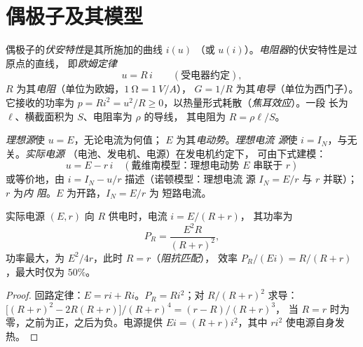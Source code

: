 \section{偶极子及其模型}

\begin{definition}\label{def:b1:dc-circuits:resistor}
偶极子的\emph{伏安特性}是其所施加的曲线 $i(u)$
（或 $u(i)$）。\emph{电阻器}的伏安特性是过原点的直线，
即\emph{欧姆定律}
\[
u = R\,i \qquad (\text{受电器约定}),
\]
$R$ 为其\emph{电阻}（单位为欧姆，$\qty{1}{\ohm} = \qty{1}{V/A}$），
$G = 1/R$ 为其\emph{电导}（单位为西门子）。它接收的功率为 $p = Ri^2 =
u^2/R \geq 0$，以热量形式耗散（\emph{焦耳效应}）。一段
长为 $\ell$、横截面积为 $S$、电阻率为 $\rho$ 的导线，
其电阻为 $R = \rho\ell/S$。
\end{definition}

\begin{definition}[理想电源与实际电源]\label{def:b1:dc-circuits:sources}
\emph{理想源}使 $u = E$，无论电流为何值；
$E$ 为其\emph{电动势}。\emph{理想电流
源}使 $i = I_N$，与无关。\emph{实际电源}
（电池、发电机、电源）在发电机约定下，
可由下式建模：
\[
u = E - r\,i \quad (\text{戴维南模型：理想电动势 } E \text{ 串联于 } r)
\]
或等价地，由 $i = I_N - u/r$ 描述（诺顿模型：理想电流
源 $I_N = E/r$ 与 $r$ 并联）；$r$ 为\emph{内
阻}。$E$ 为开路，$I_N = E/r$ 为
短路电流。
\end{definition}

\begin{proposition}[实际电源的功率平衡]\label{prop:b1:dc-circuits:sourcepower}
实际电源 $(E, r)$ 向 $R$ 供电时，电流 $i = E/(R + r)$，
其功率为
\[
P_R = \frac{E^2 R}{(R + r)^2},
\]
功率最大，为 $E^2/4r$，此时 $R = r$（\emph{阻抗匹配}），
效率 $P_R/(Ei) = R/(R + r)$，最大时仅为 $50\%$。
\end{proposition}

\begin{proof}
回路定律：$E = ri + Ri$。$P_R = Ri^2$；对 $R/(R + r)^2$ 求导：
$\big[(R + r)^2 - 2R(R + r)\big]/(R + r)^4 = (r - R)/(R + r)^3$，
当 $R = r$ 时为零，之前为正，之后为负。电源提供
$Ei = (R + r)i^2$，其中 $ri^2$ 使电源自身发热。
\end{proof}

